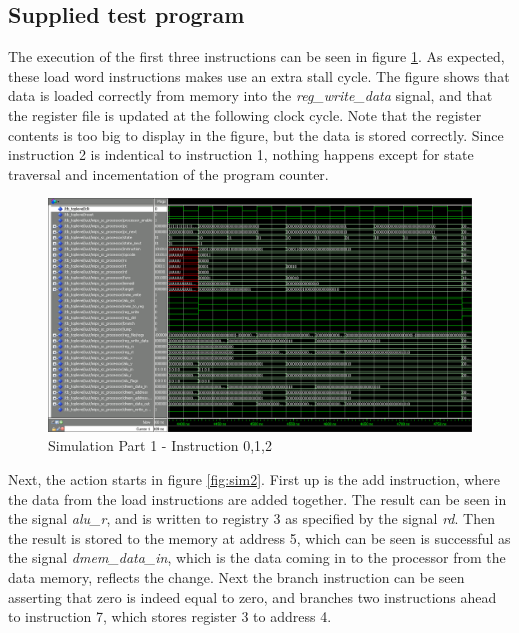 \subsection{Supplied test program}
The execution of the first three instructions can be seen in figure \ref{fig:sim1}. As expected, these load word instructions makes use an extra stall cycle. The figure shows that data is loaded correctly from memory into the \emph{reg_write_data} signal, and that the register file is updated at the following clock cycle. Note that the register contents is too big to display in the figure, but the data is stored correctly. Since instruction 2 is indentical to instruction 1, nothing happens except for state traversal and incementation of the program counter.
\begin{figure}[ht]
    \centering
    \includegraphics[scale=0.36]{figures/sim1.png}
    \caption{\label{fig:sim1}Simulation Part 1 - Instruction 0,1,2}
\end{figure}

Next, the action starts in figure \ref{fig:sim2}. First up is the add instruction, where the data from the load instructions are added together. The result can be seen in the signal \emph{alu_r}, and is written to registry 3 as specified by the signal \emph{rd}. Then the result is stored to the memory at address 5, which can be seen is successful as the signal \emph{dmem_data_in}, which is the data coming in to the processor from the data memory, reflects the change. Next the branch instruction can be seen asserting that zero is indeed equal to zero, and branches two instructions ahead to instruction 7, which stores register 3 to address 4.

